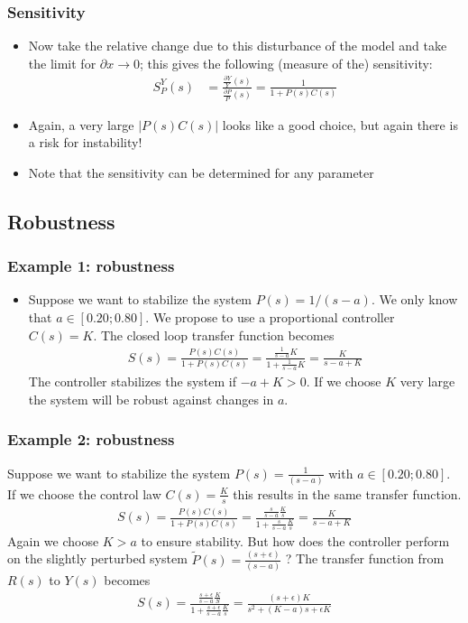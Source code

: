 \begin{frame}
	\frametitle{Sensitivity}
	\begin{itemize}
		\item Now take the relative change due to this disturbance of the model and take the limit for $\partial x \rightarrow 0$; this gives the following (measure of the) sensitivity:
		\begin{align*}
			S_P^Y(s) &= \frac{\frac{\partial Y}{Y}(s)}{\frac{\partial P}{P}(s)} = \frac{1}{1 + P(s)C(s)}
		\end{align*}
		\item Again, a very large $\left|P(s)C(s)\right|$ looks like a good choice, but again there is a risk for instability!
		\item Note that the sensitivity can be determined for any parameter	
	\end{itemize}
\end{frame}


\subsection[Robustness]{Robustness}
\begin{frame}
	\frametitle{Example 1: robustness}
	\begin{itemize}
		\item Suppose we want to stabilize the system $P(s)=1/(s - a)$.  We only know that $a \in [0.20;0.80]$. We propose to use a proportional controller $C(s)=K$.
		The closed loop transfer function becomes
		\begin{align*}
			S(s) = \frac{P(s)C(s)}{1+P(s)C(s)} = \frac{\frac{1}{s-a}K}{1+\frac{1}{s-a}K} = \frac{K}{s-a+K}
		\end{align*}
		The controller stabilizes the system if $−a+K>0$. If we choose $K$ very large the system will be robust against changes in $a$.
		
	\end{itemize}
\end{frame}


\begin{frame}
	\frametitle{Example 2: robustness}
	Suppose we want to stabilize the system $P(s)=\frac{1}{(s - a)}$ with $a\in[0.20;0.80]$. If we choose the control law $C(s)=\frac{K}{s}$ this results in the same transfer function.
	\begin{align*}
		S(s) = \frac{P(s)C(s)}{1+P(s)C(s)} = \frac{\frac{s}{s-a}\frac{K}{s}}{1+\frac{s}{s-a} \frac{K}{s}} = \frac{K}{s-a+K}
	\end{align*}
	Again we choose $K>a$ to ensure stability.
	But how does the controller perform on the slightly perturbed system $\tilde{P}(s)=\frac{(s+\epsilon)}{(s - a)}$  ?
	The transfer function from $R(s)$ to $Y(s)$ becomes
	\begin{align*}
		S(s) = \frac{\frac{s+\epsilon}{s-a} \frac{K}{S}}{1+\frac{s+\epsilon}{s-a}\frac{K}{s}}
		= \frac{(s+\epsilon)K}{s^2 + (K-a)s + \epsilon K}
	\end{align*}
\end{frame}


